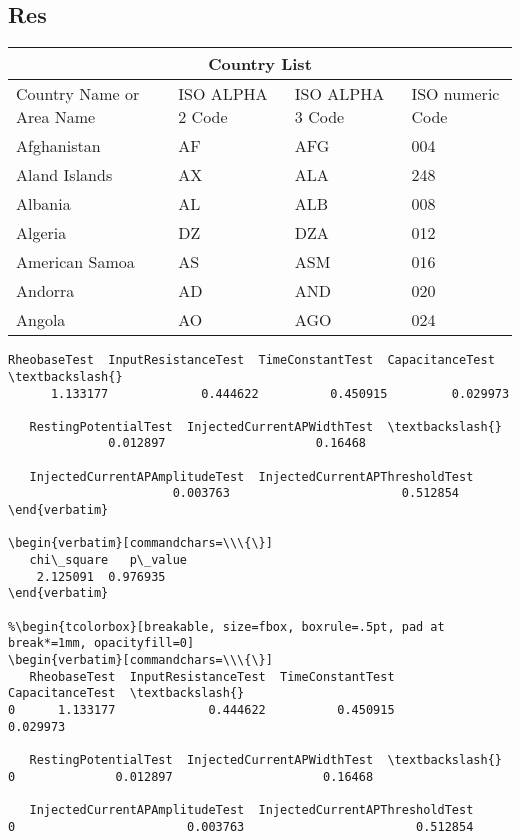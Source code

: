 
\subsection{Res}


\setlength{\arrayrulewidth}{1mm}
\setlength{\tabcolsep}{18pt}
\renewcommand{\arraystretch}{2.5}

\begin{tabular}{ |p{3cm}||p{3cm}|p{3cm}|p{3cm}|  }
 \hline
 \multicolumn{4}{|c|}{Country List} \\
 \hline
 Country Name     or Area Name& ISO ALPHA 2 Code &ISO ALPHA 3 Code&ISO numeric Code\\
 \hline
 Afghanistan   & AF    &AFG&   004\\
 Aland Islands&   AX  & ALA   &248\\
 Albania &AL & ALB&  008\\
 Algeria    &DZ & DZA&  012\\
 American Samoa&   AS  & ASM&016\\
 Andorra& AD  & AND   &020\\
 Angola& AO  & AGO&024\\
 \hline
\end{tabular}

            \begin{tcolorbox}[breakable, size=fbox, boxrule=.5pt, pad at break*=1mm, opacityfill=0]
\begin{Verbatim}[commandchars=\\\{\}]
   RheobaseTest  InputResistanceTest  TimeConstantTest  CapacitanceTest  \textbackslash{}
      1.133177             0.444622          0.450915         0.029973

   RestingPotentialTest  InjectedCurrentAPWidthTest  \textbackslash{}
              0.012897                     0.16468

   InjectedCurrentAPAmplitudeTest  InjectedCurrentAPThresholdTest
                       0.003763                        0.512854
\end{verbatim}

\begin{verbatim}[commandchars=\\\{\}]
   chi\_square   p\_value
    2.125091  0.976935
\end{verbatim}

%\begin{tcolorbox}[breakable, size=fbox, boxrule=.5pt, pad at break*=1mm, opacityfill=0]
\begin{verbatim}[commandchars=\\\{\}]
   RheobaseTest  InputResistanceTest  TimeConstantTest  CapacitanceTest  \textbackslash{}
0      1.133177             0.444622          0.450915         0.029973

   RestingPotentialTest  InjectedCurrentAPWidthTest  \textbackslash{}
0              0.012897                     0.16468

   InjectedCurrentAPAmplitudeTest  InjectedCurrentAPThresholdTest
0                        0.003763                        0.512854
\end{Verbatim}
\end{tcolorbox}
        

